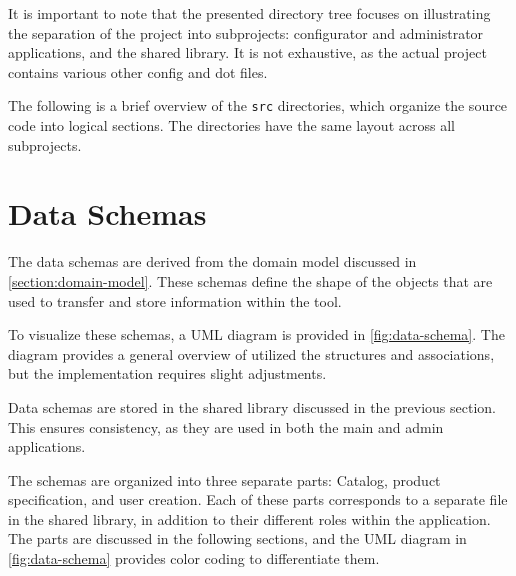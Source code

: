 It is important to note that the presented directory tree focuses on illustrating the separation of the project into subprojects: configurator and administrator applications, and the shared library. It is not exhaustive, as the actual project contains various other config and dot files.

The following is a brief overview of the \texttt{src} directories, which organize the source code into logical sections. The directories have the same layout across all subprojects.

\vspace{12pt}
\vspace{16pt}

\section{Data Schemas} \label{section:data-schemas}

The data schemas are derived from the domain model discussed in \autoref{section:domain-model}. These schemas define the shape of the objects that are used to transfer and store information within the tool. 

To visualize these schemas, a UML diagram is provided in \autoref{fig:data-schema}. The diagram provides a general overview of utilized the structures and associations, but the implementation requires slight adjustments.

Data schemas are stored in the shared library discussed in the previous section. This ensures consistency, as they are used in both the main and admin applications. 

The schemas are organized into three separate parts: Catalog, product specification, and user creation. Each of these parts corresponds to a separate file in the shared library, in addition to their different roles within the application. The parts are discussed in the following sections, and the UML diagram in \autoref{fig:data-schema} provides color coding to differentiate them.

